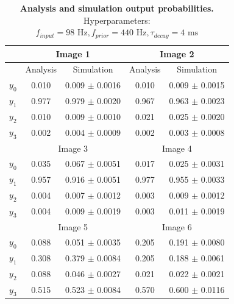 \begin{table}[]
\centering
\label{tab:1D_98_440_4}
\small
\tabcolsep=0.11cm
\begin{tabular}{|c|cc|cc|}
\hline
                       & \multicolumn{2}{c|}{Image 1}                       & \multicolumn{2}{c|}{Image 2}                       \\ \hline
                       & \multicolumn{1}{c|}{Analysis} & Simulation         & \multicolumn{1}{c|}{Analysis} & Simulation         \\ \hline
$y_0$                  & \multicolumn{1}{c|}{0.010}    & 0.009 $\pm$ 0.0016 & \multicolumn{1}{c|}{0.010}    & 0.009 $\pm$ 0.0015 \\ \hline
$y_1$                  & \multicolumn{1}{c|}{0.977}    & 0.979 $\pm$ 0.0020 & \multicolumn{1}{c|}{0.967}    & 0.963 $\pm$ 0.0023 \\ \hline
$y_2$                  & \multicolumn{1}{c|}{0.010}    & 0.009 $\pm$ 0.0010 & \multicolumn{1}{c|}{0.021}    & 0.025 $\pm$ 0.0020 \\ \hline
$y_3$                  & \multicolumn{1}{c|}{0.002}    & 0.004 $\pm$ 0.0009 & \multicolumn{1}{c|}{0.002}    & 0.003 $\pm$ 0.0008 \\ \hline
                       & \multicolumn{2}{c|}{Image 3}                       & \multicolumn{2}{c|}{Image 4}                       \\ \hline
$y_0$                  & \multicolumn{1}{c|}{0.035}    & 0.067 $\pm$ 0.0051 & \multicolumn{1}{c|}{0.017}    & 0.025 $\pm$ 0.0031 \\ \hline
$y_1$                  & \multicolumn{1}{c|}{0.957}    & 0.916 $\pm$ 0.0051 & \multicolumn{1}{c|}{0.977}    & 0.955 $\pm$ 0.0033 \\ \hline
$y_2$                  & \multicolumn{1}{c|}{0.004}    & 0.007 $\pm$ 0.0012 & \multicolumn{1}{c|}{0.003}    & 0.009 $\pm$ 0.0012 \\ \hline
$y_3$                  & \multicolumn{1}{c|}{0.004}    & 0.009 $\pm$ 0.0019 & \multicolumn{1}{c|}{0.003}    & 0.011 $\pm$ 0.0019 \\ \hline
						& \multicolumn{2}{c|}{Image 5}                       & \multicolumn{2}{c|}{Image 6}                       \\ \hline
$y_0$                  & \multicolumn{1}{c|}{0.088}    & 0.051 $\pm$ 0.0035 & \multicolumn{1}{c|}{0.205}    & 0.191 $\pm$ 0.0080 \\ \hline
$y_1$                  & \multicolumn{1}{c|}{0.308}    & 0.379 $\pm$ 0.0084 & \multicolumn{1}{c|}{0.205}    & 0.188 $\pm$ 0.0061 \\ \hline
$y_2$                  & \multicolumn{1}{c|}{0.088}    & 0.046 $\pm$ 0.0027 & \multicolumn{1}{c|}{0.021}    & 0.022 $\pm$ 0.0021 \\ \hline
$y_3$                  & \multicolumn{1}{c|}{0.515}    & 0.523 $\pm$ 0.0084 & \multicolumn{1}{c|}{0.570}    & 0.600 $\pm$ 0.0116 \\ \hline
\end{tabular}
\caption{\textbf{Analysis and simulation output probabilities. } Hyperparameters: $f_{input} = 98\text{ Hz}, f_{prior} = 440\text{ Hz}, \tau_{decay} = 4\text{ ms}$}
\end{table}

